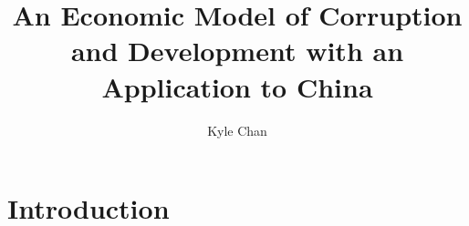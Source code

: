 \documentclass[preprint,10pt]{elsarticle}
\begin{document}
\begin{frontmatter}


\title{An Economic Model of Corruption and Development with an Application to China}




\author{Kyle Chan}

\address{Princeton University}



\end{frontmatter}

\section{Introduction}
\label{S:0}
\end{document}
